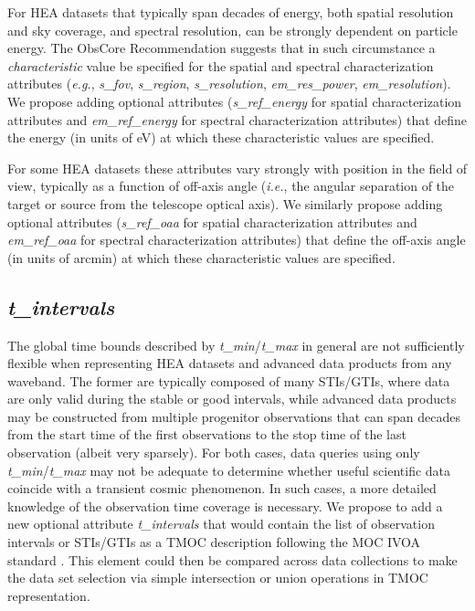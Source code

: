 \documentclass[11pt,a4paper]{ivoa}
\begin{document}
For HEA datasets that typically span decades of energy, both spatial resolution and sky coverage, and spectral resolution, can be strongly dependent on particle energy.  The ObsCore Recommendation suggests that in such circumstance a {\em characteristic\/} value be specified for the spatial and spectral characterization attributes ({\em e.g.\/}, {\em s\_fov\/}, {\em s\_region\/}, {\em s\_resolution\/}, {\em em\_res\_power\/}, {\em em\_resolution\/}).  We propose adding optional attributes ({\em s\_ref\_energy\/} for spatial characterization attributes and {\em em\_ref\_energy\/} for spectral characterization attributes) that define the energy (in units of eV) at which these characteristic values are specified.

For some HEA datasets these attributes vary strongly with position in the field of view, typically as a function of off-axis angle ({\em i.e.\/}, the angular separation of the target or source from the telescope optical axis). We similarly propose adding optional attributes ({\em s\_ref\_oaa\/} for spatial characterization attributes and {\em em\_ref\_oaa\/} for spectral characterization attributes) that define the off-axis angle (in units of arcmin) at which these characteristic values are specified.

\subsection{{\em t\_intervals}}

The global time bounds described by {\em t\_min\/}/{\em t\_max} in general are not sufficiently flexible when representing HEA datasets and advanced data products from any waveband.  The former are typically composed of many \gls{STIs}/\gls{GTIs}, where data are only valid during the stable or good intervals, while advanced data products may be constructed from multiple progenitor observations that can span decades from the start time of the first observations to the stop time of the last observation (albeit very sparsely).  For both cases, data queries using only {\em t\_min\/}/{\em t\_max} may not be adequate to determine whether useful scientific data coincide with a transient cosmic phenomenon.  In such cases, a more detailed knowledge of the observation time coverage is necessary.  We propose to add a new optional attribute {\em t\_intervals} that would contain the list of observation intervals or STIs/GTIs as a TMOC description following the \gls{MOC} IVOA standard  \citep{2022ivoa.spec.0727F}. This element could then be compared across data collections to make the data set selection via simple intersection or union operations in TMOC representation.
\end{document}
